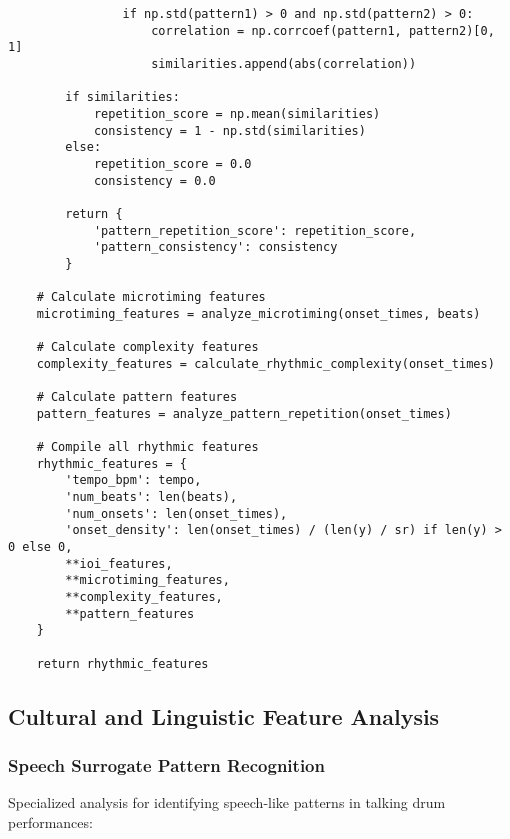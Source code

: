 \documentclass[12pt]{article}
\begin{document}
\begin{verbatim}
                if np.std(pattern1) > 0 and np.std(pattern2) > 0:
                    correlation = np.corrcoef(pattern1, pattern2)[0, 1]
                    similarities.append(abs(correlation))
        
        if similarities:
            repetition_score = np.mean(similarities)
            consistency = 1 - np.std(similarities)
        else:
            repetition_score = 0.0
            consistency = 0.0
        
        return {
            'pattern_repetition_score': repetition_score,
            'pattern_consistency': consistency
        }
    
    # Calculate microtiming features
    microtiming_features = analyze_microtiming(onset_times, beats)
    
    # Calculate complexity features
    complexity_features = calculate_rhythmic_complexity(onset_times)
    
    # Calculate pattern features
    pattern_features = analyze_pattern_repetition(onset_times)
    
    # Compile all rhythmic features
    rhythmic_features = {
        'tempo_bpm': tempo,
        'num_beats': len(beats),
        'num_onsets': len(onset_times),
        'onset_density': len(onset_times) / (len(y) / sr) if len(y) > 0 else 0,
        **ioi_features,
        **microtiming_features,
        **complexity_features,
        **pattern_features
    }
    
    return rhythmic_features
\end{verbatim}

\subsection{Cultural and Linguistic Feature Analysis}

\subsubsection{Speech Surrogate Pattern Recognition}
Specialized analysis for identifying speech-like patterns in talking drum performances:
\end{document}

